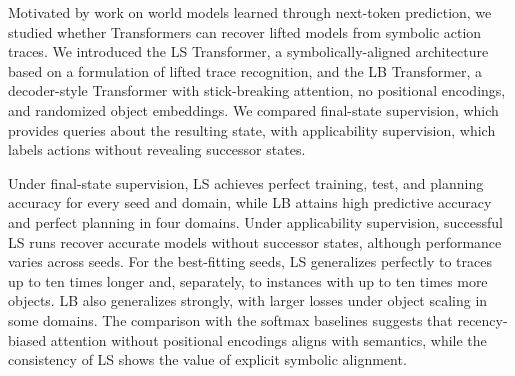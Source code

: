

Motivated by work on world models learned through next-token prediction, we studied whether Transformers can recover lifted \strips models from symbolic action traces.
We introduced the LS Transformer, a symbolically-aligned architecture based on a \brasp formulation of lifted \strips trace recognition, and the LB Transformer, a decoder-style Transformer with stick-breaking attention, no positional encodings, and randomized object embeddings.
We compared final-state supervision, which provides queries about the resulting state, with applicability supervision, which labels actions without revealing successor states.

Under final-state supervision, LS achieves perfect training, test, and planning accuracy for every seed and domain, while LB attains high predictive accuracy and perfect planning in four domains.
Under applicability supervision, successful LS runs recover accurate models without successor states, although performance varies across seeds.
For the best-fitting seeds, LS generalizes perfectly to traces up to ten times longer and, separately, to instances with up to ten times more objects.
LB also generalizes strongly, with larger losses under object scaling in some domains.
The comparison with the softmax baselines suggests that recency-biased attention without positional encodings aligns with \strips semantics, while the consistency of LS shows the value of explicit symbolic alignment.

